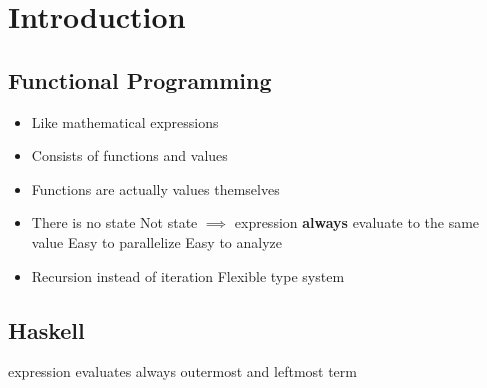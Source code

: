 
\section{Introduction}
\subsection{Functional Programming}
\begin{itemize}
    \item Like mathematical expressions
    \item Consists of functions and values
    \item Functions are actually values themselves
    \item There is no state
     Not state $\implies$ expression \textbf{always} evaluate to the same value
    \ipro Easy to parallelize
    \ipro Easy to analyze
    \item Recursion instead of iteration
    \ipro Flexible type system
\end{itemize}

\subsection{Haskell}
\begin{itemize}
     expression evaluates always outermost and leftmost term
\end{itemize}

